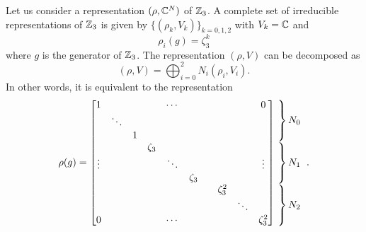 \documentclass[a4paper,10pt]{article}
\begin{document}
            Let us consider a representation $(\rho,\mathbb{C}^N)$ of $\mathbb{Z}_3$. A complete set of irreducible representations of $\mathbb{Z}_3$ is given by $\{(\rho_k,V_k)\}_{k=0,1,2}$ with $V_k=\mathbb{C}$ and
            \begin{equation}
                \rho_i(g)=\zeta^k_3
            \end{equation}
            where $g$ is the generator of $\mathbb{Z}_3$. The representation $(\rho,V)$ can be decomposed as
            \begin{equation}
                (\rho,V)=\bigoplus^{2}_{i=0}N_i(\rho_i,V_i).
            \end{equation}
            In other words, it is equivalent to the representation
            \begin{equation}
                \rho(g)=
                \begin{bmatrix}
                    1 & & & & \cdots & & & & & 0 \\
                    & \ddots & & & & & & & & \\
                    & & 1 & & & & & & & \\
                    & & & \zeta_3 & & & & & & \\
                    \vdots & & & & \ddots & & & & & \vdots \\
                    & & & & & \zeta_3 & & & & \\
                    & & & & & & & \zeta^2_3 & & \\
                    & & & & & & & & \ddots & \\
                    0 & & & & \cdots & & & & & \zeta^2_3 \\
                \end{bmatrix}
                \hspace{-0.2cm}
                \begin{tabular}{l}
                $\left.\lefteqn{\phantom{
                    \begin{matrix}
                        a_0\\ \ddots\\ a_0\ 
                    \end{matrix} 
                }}\right\}N_0$\\
                $\left.\lefteqn{\phantom{
                    \begin{matrix}
                        a_0\\ \ddots\\ a_0\ 
                    \end{matrix} 
                }}\right\}N_1$\\
                $\left.\lefteqn{\phantom{
                    \begin{matrix}
                        b_0\\ \ddots\\ b_0\ 
                    \end{matrix}
                }} \right\}N_2$
                \end{tabular}.\label{eq:reprrhoZn}
            \end{equation}
\end{document}
